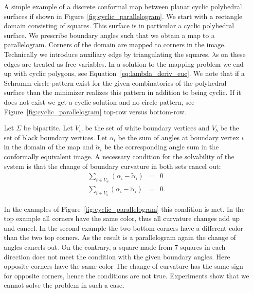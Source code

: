 \documentclass[Thesis]{subfiles}
\begin{document}
A simple example of a discrete conformal map between planar cyclic polyhedral surfaces if shown in Figure~\ref{fig:cyclic_parallelogram}. 
We start with a rectangle domain consisting of squares. 
This surface is in particular a cyclic polyhedral surface. 
We prescribe boundary angles such that we obtain a map to a parallelogram.
Corners of the domain are mapped to corners in the image. 
Technically we introduce auxiliary edge by triangulating the squares. $\lambda$s on these edges are treated as free variables. 
In a solution to the mapping problem we end up with cyclic polygons, see Equation~\ref{eq:lambda_deriv_euc}.
We note that if a Schramm-circle-pattern \cite{S97} exist for the given combinatorics of the polyhedral surface than the minimizer realizes this pattern in addition to being cyclic. 
If it does not exist we get a cyclic solution and no circle pattern, see Figure~\ref{fig:cyclic_parallelogram} top-row versus bottom-row.

\begin{conjecture}
Let $\Sigma$ be bipartite. Let $V_w$ be the set of white boundary vertices and $V_b$ be the set of black boundary vertices.
Let $\alpha_i$ be the sum of angles at boundary vertex $i$ in the domain of the map and $\tilde \alpha_i$ be the corresponding angle sum in the conformally equivalent image.
A necessary condition for the solvability of the system is that the change of boundary curvature in both sets cancel out:
\begin{eqnarray}
\sum_{i\in V_w}(\alpha_i - \tilde\alpha_i) &=& 0\\
\sum_{i\in V_b}(\alpha_i - \tilde\alpha_i) &=& 0.
\end{eqnarray}
\end{conjecture}

In the examples of Figure~\ref{fig:cyclic_parallelogram} this condition is met. 
In the top example all corners have the same color, thus all curvature changes add up and cancel.
In the second example the two bottom corners have a different color than the two top corners.
As the result is a parallelogram again the change of angles cancels out.
On the contrary, a square made from $7$ squares in each direction does not meet the condition with the given boundary angles.
Here opposite corners have the same color
The change of curvature has the same sign for opposite corners, hence the conditions are not true.
Experiments show that we cannot solve the problem in such a case.
\end{document}
